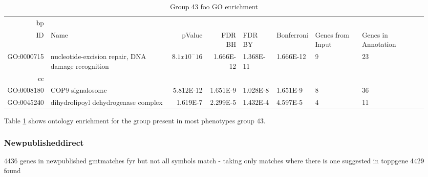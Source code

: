 \begin{table}[ht]
\centering
\begin{tabular}{rlrrlllll}
  \hline
  bp\\
 ID &	Name & 		pValue 	& FDR BH & 	FDR BY &	Bonferroni &	Genes from Input 	&Genes in Annotation\\
 GO:0000715 &	nucleotide-excision repair, DNA damage recognition  &		$8.1 x 10^-16$ &	1.666E-12 &	1.368E-11 &	1.666E-12 &	9 &	23 \\
 cc\\
GO:0008180 &	COP9 signalosome 		&5.812E-12 	&1.651E-9 &	1.028E-8 &	1.651E-9 &	8 &	36\\
GO:0045240 & 	dihydrolipoyl dehydrogenase complex 	&	1.619E-7 & 	2.299E-5 & 	1.432E-4 &	4.597E-5 & 	4  &	11 \\
  
   \hline
\end{tabular}
\caption{Group 43 foo GO enrichment}
\label{group43foogoenrichment}
\end{table}
Table \ref{group43foogoenrichment} shows ontology enrichment for the group present in most phenotypes group 43.

\subsubsection{Newpublisheddirect}

4436 genes in newpublished gmtmatches fyr
but not all symbols match - taking only matches where there is one suggested in toppgene
4429 found

